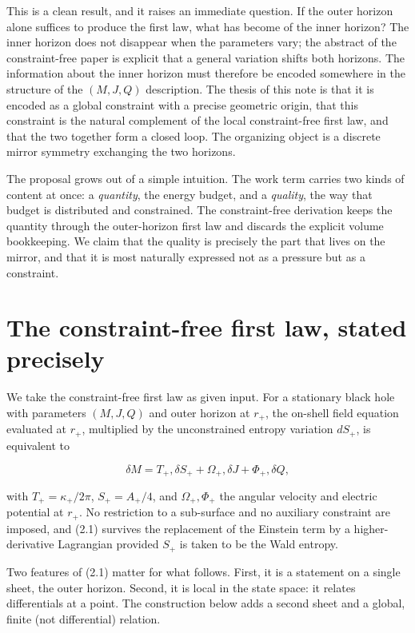 \documentclass[11pt]{article}
\begin{document}
This is a clean result, and it raises an immediate question. If the outer horizon alone suffices to produce the first law, what has become of the inner horizon? The inner horizon does not disappear when the parameters vary; the abstract of the constraint-free paper is explicit that a general variation shifts both horizons. The information about the inner horizon must therefore be encoded somewhere in the structure of the $(M,J,Q)$ description. The thesis of this note is that it is encoded as a global constraint with a precise geometric origin, that this constraint is the natural complement of the local constraint-free first law, and that the two together form a closed loop. The organizing object is a discrete mirror symmetry exchanging the two horizons.

The proposal grows out of a simple intuition. The work term carries two kinds of content at once: a \emph{quantity}, the energy budget, and a \emph{quality}, the way that budget is distributed and constrained. The constraint-free derivation keeps the quantity through the outer-horizon first law and discards the explicit volume bookkeeping. We claim that the quality is precisely the part that lives on the mirror, and that it is most naturally expressed not as a pressure but as a constraint.



\section{The constraint-free first law, stated precisely}

We take the constraint-free first law as given input. For a stationary black hole with parameters $(M,J,Q)$ and outer horizon at $r_+$, the on-shell field equation evaluated at $r_+$, multiplied by the unconstrained entropy variation $dS_+$, is equivalent to

\begin{equation*}
\delta M = T_+ ,\delta S_+ + \Omega_+ ,\delta J + \Phi_+ ,\delta Q ,
\tag{2.1}
\end{equation*}

with $T_+ = \kappa_+/2\pi$, $S_+ = A_+/4$, and $\Omega_+, \Phi_+$ the angular velocity and electric potential at $r_+$. No restriction to a sub-surface and no auxiliary constraint are imposed, and (2.1) survives the replacement of the Einstein term by a higher-derivative Lagrangian provided $S_+$ is taken to be the Wald entropy.

Two features of (2.1) matter for what follows. First, it is a statement on a single sheet, the outer horizon. Second, it is local in the state space: it relates differentials at a point. The construction below adds a second sheet and a global, finite (not differential) relation.
\end{document}
